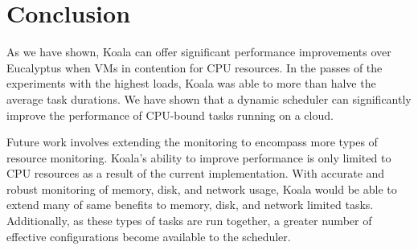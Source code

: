 \section{Conclusion}
\label{sec:conclusion}

As we have shown, Koala can offer significant performance improvements over Eucalyptus when VMs in contention for CPU resources.  In the passes of the experiments with the highest loads, Koala was able to more than halve the average task durations.  We have shown that a dynamic scheduler can significantly improve the performance of CPU-bound tasks running on a cloud.

Future work involves extending the monitoring to encompass more types of resource monitoring.
Koala's ability to improve performance is only limited to CPU resources as a result of the current implementation.  With accurate and robust monitoring of memory, disk, and network usage, Koala would be able to extend many of same benefits to memory, disk, and network limited tasks.  Additionally, as these types of tasks are run together, a greater number of effective configurations become available to the scheduler.  

